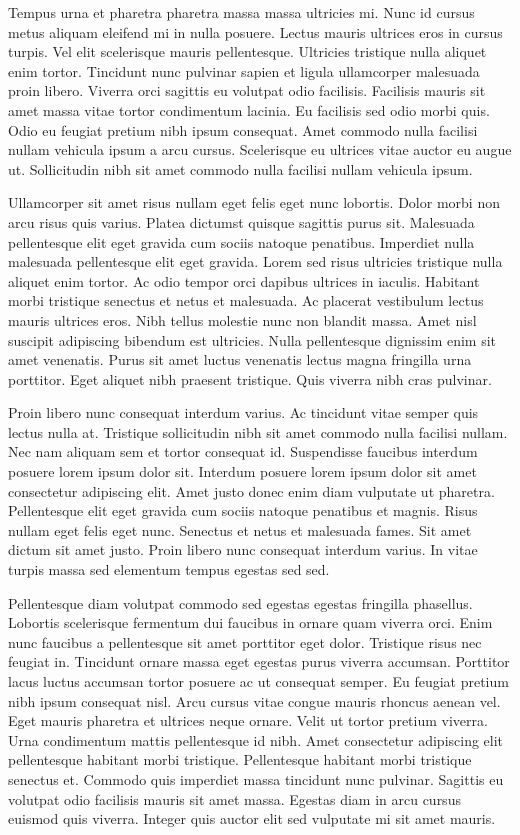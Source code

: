 \documentclass[11pt,a4paper]{article}
\begin{document}
Tempus urna et pharetra pharetra massa massa ultricies mi. Nunc id cursus metus aliquam eleifend mi in nulla posuere. Lectus mauris ultrices eros in cursus turpis. Vel elit scelerisque mauris pellentesque. Ultricies tristique nulla aliquet enim tortor. Tincidunt nunc pulvinar sapien et ligula ullamcorper malesuada proin libero. Viverra orci sagittis eu volutpat odio facilisis. Facilisis mauris sit amet massa vitae tortor condimentum lacinia. Eu facilisis sed odio morbi quis. Odio eu feugiat pretium nibh ipsum consequat. Amet commodo nulla facilisi nullam vehicula ipsum a arcu cursus. Scelerisque eu ultrices vitae auctor eu augue ut. Sollicitudin nibh sit amet commodo nulla facilisi nullam vehicula ipsum.

Ullamcorper sit amet risus nullam eget felis eget nunc lobortis. Dolor morbi non arcu risus quis varius. Platea dictumst quisque sagittis purus sit. Malesuada pellentesque elit eget gravida cum sociis natoque penatibus. Imperdiet nulla malesuada pellentesque elit eget gravida. Lorem sed risus ultricies tristique nulla aliquet enim tortor. Ac odio tempor orci dapibus ultrices in iaculis. Habitant morbi tristique senectus et netus et malesuada. Ac placerat vestibulum lectus mauris ultrices eros. Nibh tellus molestie nunc non blandit massa. Amet nisl suscipit adipiscing bibendum est ultricies. Nulla pellentesque dignissim enim sit amet venenatis. Purus sit amet luctus venenatis lectus magna fringilla urna porttitor. Eget aliquet nibh praesent tristique. Quis viverra nibh cras pulvinar.

Proin libero nunc consequat interdum varius. Ac tincidunt vitae semper quis lectus nulla at. Tristique sollicitudin nibh sit amet commodo nulla facilisi nullam. Nec nam aliquam sem et tortor consequat id. Suspendisse faucibus interdum posuere lorem ipsum dolor sit. Interdum posuere lorem ipsum dolor sit amet consectetur adipiscing elit. Amet justo donec enim diam vulputate ut pharetra. Pellentesque elit eget gravida cum sociis natoque penatibus et magnis. Risus nullam eget felis eget nunc. Senectus et netus et malesuada fames. Sit amet dictum sit amet justo. Proin libero nunc consequat interdum varius. In vitae turpis massa sed elementum tempus egestas sed sed.

Pellentesque diam volutpat commodo sed egestas egestas fringilla phasellus. Lobortis scelerisque fermentum dui faucibus in ornare quam viverra orci. Enim nunc faucibus a pellentesque sit amet porttitor eget dolor. Tristique risus nec feugiat in. Tincidunt ornare massa eget egestas purus viverra accumsan. Porttitor lacus luctus accumsan tortor posuere ac ut consequat semper. Eu feugiat pretium nibh ipsum consequat nisl. Arcu cursus vitae congue mauris rhoncus aenean vel. Eget mauris pharetra et ultrices neque ornare. Velit ut tortor pretium viverra. Urna condimentum mattis pellentesque id nibh. Amet consectetur adipiscing elit pellentesque habitant morbi tristique. Pellentesque habitant morbi tristique senectus et. Commodo quis imperdiet massa tincidunt nunc pulvinar. Sagittis eu volutpat odio facilisis mauris sit amet massa. Egestas diam in arcu cursus euismod quis viverra. Integer quis auctor elit sed vulputate mi sit amet mauris.
\end{document}
